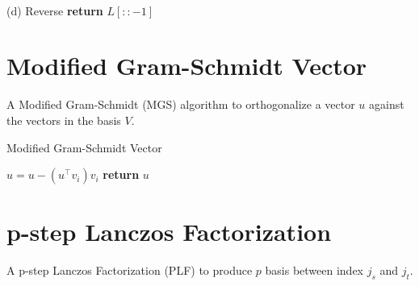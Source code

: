 \documentclass[a4paper]{article}
\begin{document}
\begin{algorithm}
\begin{algorithmic}[1]
    \EndWhile
    
\EndFor



\\ (d) Reverse
\State \textbf{return} $L[::-1]$


\EndProcedure
\end{algorithmic}
\end{algorithm}




























\pagebreak

\section{Modified Gram-Schmidt Vector}
A Modified Gram-Schmidt (MGS) algorithm to orthogonalize a vector $u$ against the vectors in the basis $V$. 




\begin{algorithm}
\caption{Modified Gram-Schmidt Vector}\label{alg:MGSV}
\begin{algorithmic}[1]

    \State $ u = u - (u^\top v_i) v_i$
\EndFor
\State \textbf{return} $ u $
\EndProcedure
\end{algorithmic}
\end{algorithm}

\section{p-step Lanczos Factorization}
A p-step Lanczos Factorization (PLF) to produce $p$ basis between index $j_s$ and $j_t$. 
\end{document}
